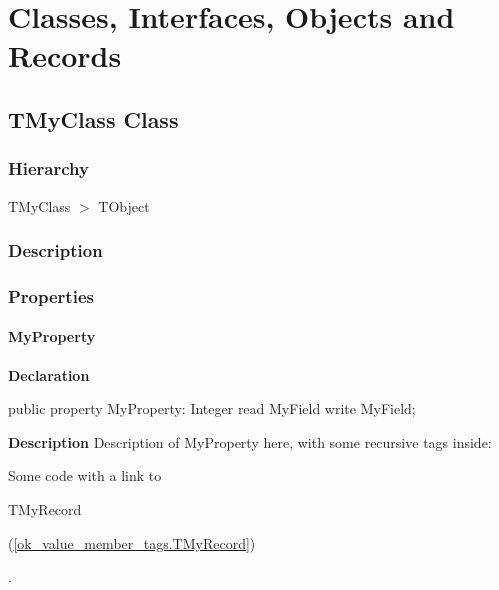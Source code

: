 \documentclass{report}
\begin{document}
\section{Classes, Interfaces, Objects and Records}
\subsection*{TMyClass Class}
\subsubsection*{\large{\textbf{Hierarchy}}\normalsize\hspace{1ex}\hfill}
TMyClass {$>$} TObject
\subsubsection*{\large{\textbf{Description}}\normalsize\hspace{1ex}\hfill}
  \subsubsection*{\large{\textbf{Properties}}\normalsize\hspace{1ex}\hfill}
\paragraph*{MyProperty}\hspace*{\fill}

\begin{list}{}{
\setlength{\itemindent}{0cm}
\setlength{\listparindent}{0cm}
\setlength{\leftmargin}{\evensidemargin}
\addtolength{\leftmargin}{\tmplength}
\settowidth{\labelsep}{X}
\addtolength{\leftmargin}{\labelsep}
\setlength{\labelwidth}{\tmplength}
}
\begin{flushleft}
\item[\textbf{Declaration}\hfill]
\begin{ttfamily}
public property MyProperty: Integer read MyField write MyField;\end{ttfamily}


\end{flushleft}
\par
\item[\textbf{Description}]
Description of MyProperty here, with some recursive tags inside: \begin{ttfamily}Some code with a link to \begin{ttfamily}TMyRecord\end{ttfamily}(\ref{ok_value_member_tags.TMyRecord})\end{ttfamily}.

\end{list}
\end{document}
